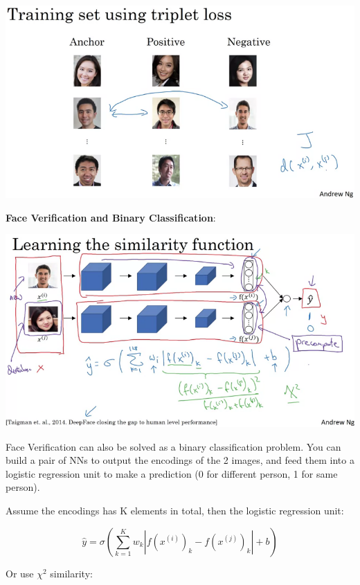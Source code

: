 \documentclass{article}
\begin{document}
\begin{center}
\includegraphics[scale=0.4]{./images/triplet_train_set.png}
\end{center}

\noindent \textbf{Face Verification and Binary Classification}:

\begin{center}
\includegraphics[scale=0.4]{./images/face_verification_binary.png}
\end{center}

\noindent Face Verification can also be solved as a binary classification problem. You can build a pair of NNs to output the encodings of the 2 images, and feed them into a logistic regression unit to make a prediction (0 for different person, 1 for same person).

\bigskip

\noindent Assume the encodings has K elements in total, then the logistic regression unit:

\[\hat{y} = \sigma(\sum_{k = 1}^{K} w_{k} |f(x^{(i)})_{k} - f(x^{(j)})_{k}| + b)\]

\noindent Or use \(\chi^{2}\) similarity:
\end{document}
